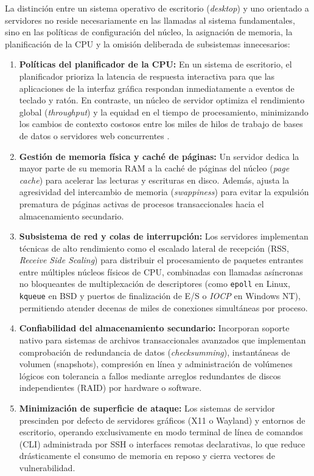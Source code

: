 \documentclass[12pt]{article}
\begin{document}
La distinción entre un sistema operativo de escritorio (\textit{desktop}) y uno orientado a servidores no reside necesariamente en las llamadas al sistema fundamentales, sino en las políticas de configuración del núcleo, la asignación de memoria, la planificación de la CPU y la omisión deliberada de subsistemas innecesarios:
\begin{enumerate}[noitemsep, topsep=2pt, parsep=0pt]
    \item \textbf{Políticas del planificador de la CPU:} En un sistema de escritorio, el planificador prioriza la latencia de respuesta interactiva para que las aplicaciones de la interfaz gráfica respondan inmediatamente a eventos de teclado y ratón. En contraste, un núcleo de servidor optimiza el rendimiento global (\textit{throughput}) y la equidad en el tiempo de procesamiento, minimizando los cambios de contexto costosos entre los miles de hilos de trabajo de bases de datos o servidores web concurrentes \parencite[\S 18.1, pp.\ 18-3--18-4]{stallings2018operating}.
    \item \textbf{Gestión de memoria física y caché de páginas:} Un servidor dedica la mayor parte de su memoria RAM a la caché de páginas del núcleo (\textit{page cache}) para acelerar las lecturas y escrituras en disco. Además, ajusta la agresividad del intercambio de memoria (\textit{swappiness}) para evitar la expulsión prematura de páginas activas de procesos transaccionales hacia el almacenamiento secundario.
    \item \textbf{Subsistema de red y colas de interrupción:} Los servidores implementan técnicas de alto rendimiento como el escalado lateral de recepción (RSS, \textit{Receive Side Scaling}) para distribuir el procesamiento de paquetes entrantes entre múltiples núcleos físicos de CPU, combinadas con llamadas asíncronas no bloqueantes de multiplexación de descriptores (como \texttt{epoll} en Linux, \texttt{kqueue} en BSD y puertos de finalización de E/S o \textit{IOCP} en Windows NT), permitiendo atender decenas de miles de conexiones simultáneas por proceso.
    \item \textbf{Confiabilidad del almacenamiento secundario:} Incorporan soporte nativo para sistemas de archivos transaccionales avanzados que implementan comprobación de redundancia de datos (\textit{checksumming}), instantáneas de volumen (snapshots), compresión en línea y administración de volúmenes lógicos con tolerancia a fallos mediante arreglos redundantes de discos independientes (RAID) por hardware o software.
    \item \textbf{Minimización de superficie de ataque:} Los sistemas de servidor prescinden por defecto de servidores gráficos (X11 o Wayland) y entornos de escritorio, operando exclusivamente en modo terminal de línea de comandos (CLI) administrada por SSH o interfaces remotas declarativas, lo que reduce drásticamente el consumo de memoria en reposo y cierra vectores de vulnerabilidad.
\end{enumerate}
\end{document}
